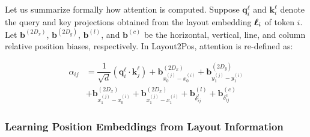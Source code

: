 Let us summarize formally how attention is computed. Suppose $\bm{q}^{\ell}_i$ and $\bm{k}^{\ell}_i$ denote the query and key projections obtained from the layout embedding $\boldsymbol{\ell}_i$ of token $i$. Let $\bm{b}^{(2D_x)}$, $\bm{b}^{(2D_y)}$, $\bm{b}^{(l)}$, and $\bm{b}^{(c)}$ be the horizontal, vertical, line, and column relative position biases, respectively. In Layout2Pos, attention is re-defined as:

\begin{equation}
  \begin{split}
  \alpha_{ij} &= \dfrac{1}{\sqrt{d}} \left(\bm{q}^{\ell}_i \cdot \bm{k}^{\ell}_j\right)
              + \bm{b}^{(2D_x)}_{x^{(j)}_{0} - x^{(i)}_{0}} + \bm{b}^{(2D_y)}_{y^{(j)}_{1} - y^{(i)}_{1}} \\
              & + \bm{b}^{(2D_x)}_{x^{(j)}_{1} - x^{(i)}_{0}} + \bm{b}^{(2D_x)}_{x^{(j)}_{1} - x^{(i)}_{1}} 
               + \bm{b}^{(l)}_{\delta^{l}_{ij}}  + \bm{b}^{(c)}_{\delta^{c}_{ij}}
  \end{split}
\label{eq:layout2pos-attention}
\end{equation}



\subsubsection{Learning Position Embeddings from Layout Information}


